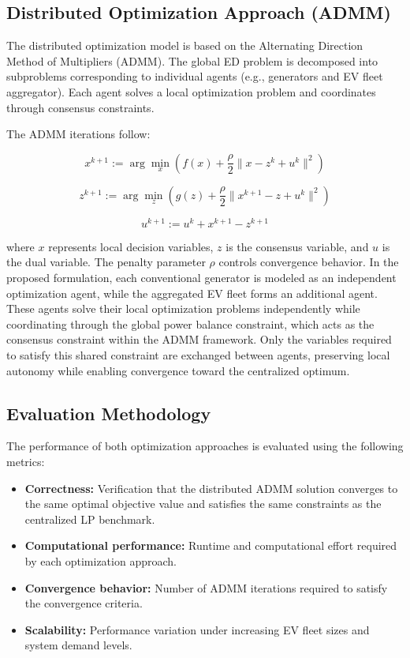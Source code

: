 \documentclass[12pt, a4paper]{article}
\begin{document}
\subsection{Distributed Optimization Approach (ADMM)}

The distributed optimization model is based on the Alternating Direction Method of Multipliers (ADMM). The global ED problem is decomposed into subproblems corresponding to individual agents (e.g., generators and EV fleet aggregator). Each agent solves a local optimization problem and coordinates through consensus constraints.

The ADMM iterations follow:

\[
x^{k+1} := \arg\min_x \left( f(x) + \frac{\rho}{2} \|x - z^k + u^k\|^2 \right)
\]

\[
z^{k+1} := \arg\min_z \left( g(z) + \frac{\rho}{2} \|x^{k+1} - z + u^k\|^2 \right)
\]

\[
u^{k+1} := u^k + x^{k+1} - z^{k+1}
\]

where $x$ represents local decision variables, $z$ is the consensus variable, and $u$ is the dual variable. The penalty parameter $\rho$ controls convergence behavior.
In the proposed formulation, each conventional generator is modeled as an independent optimization agent, while the aggregated EV fleet forms an additional agent. These agents solve their local optimization problems independently while coordinating through the global power balance constraint, which acts as the consensus constraint within the ADMM framework. Only the variables required to satisfy this shared constraint are exchanged between agents, preserving local autonomy while enabling convergence toward the centralized optimum.

\subsection{Evaluation Methodology}

The performance of both optimization approaches is evaluated using the following metrics:

\begin{itemize}
    \item \textbf{Correctness:} Verification that the distributed ADMM solution converges to the same optimal objective value and satisfies the same constraints as the centralized LP benchmark.
    \item \textbf{Computational performance:} Runtime and computational effort required by each optimization approach.
    \item \textbf{Convergence behavior:} Number of ADMM iterations required to satisfy the convergence criteria.
    \item \textbf{Scalability:} Performance variation under increasing EV fleet sizes and system demand levels.
\end{itemize}
\end{document}
